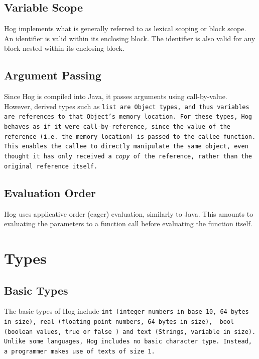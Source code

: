 \documentclass{report}
\begin{document}

\subsection{Variable Scope} %
\label{sub:variable_scope}

Hog implements what is generally referred to as lexical scoping or block scope. An
identifier is valid within its enclosing block. The identifier is also valid for
any block nested within its enclosing block.



\subsection{Argument Passing}
\label{sub:argument_passing}

Since Hog is compiled into Java, it passes arguments using call-by-value.
However, derived types such as \tt list \rm are Object types, and thus
variables are references to that Object's memory location. For these types,
Hog behaves as if it were call-by-reference, since the value of the reference (i.e. the memory location)
is passed to the callee function. This enables the callee to directly manipulate the same object,
even thought it has only received a \emph{copy} of the reference, rather than the original reference
itself.

\subsection{Evaluation Order}
\label{sub:evaluation_order}

Hog uses applicative order (eager) evaluation, similarly to Java. This amounts to evaluating
the parameters to a function call before evaluating the function itself.



\section{Types} %
\label{sec:types}

\subsection{Basic Types} %
\label{sub:basic_types}

The basic types of Hog include \tt int \rm (integer numbers in base 10, 64
bytes in size), \tt real \rm (floating point numbers, 64 bytes in size), \tt
bool \rm(boolean values, \tt true \rm or \tt false \rm) and \tt text \rm
(Strings, variable in size).  Unlike some languages, Hog includes no basic
character type. Instead, a programmer makes use of \tt text\rm s of size 1.
\end{document}

